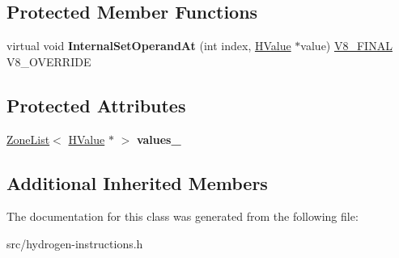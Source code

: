 \subsection*{Protected Member Functions}
\begin{DoxyCompactItemize}
\item 
\hypertarget{classv8_1_1internal_1_1_h_dematerialized_object_ace56861e04f0b484819e7523559d3c84}{}virtual void {\bfseries Internal\+Set\+Operand\+At} (int index, \hyperlink{classv8_1_1internal_1_1_h_value}{H\+Value} $\ast$value) \hyperlink{classv8_1_1internal_1_1_v8___f_i_n_a_l}{V8\+\_\+\+F\+I\+N\+A\+L} V8\+\_\+\+O\+V\+E\+R\+R\+I\+D\+E\label{classv8_1_1internal_1_1_h_dematerialized_object_ace56861e04f0b484819e7523559d3c84}

\end{DoxyCompactItemize}
\subsection*{Protected Attributes}
\begin{DoxyCompactItemize}
\item 
\hypertarget{classv8_1_1internal_1_1_h_dematerialized_object_a9d4594d10a05051dac2f37690acac70c}{}\hyperlink{classv8_1_1internal_1_1_zone_list}{Zone\+List}$<$ \hyperlink{classv8_1_1internal_1_1_h_value}{H\+Value} $\ast$ $>$ {\bfseries values\+\_\+}\label{classv8_1_1internal_1_1_h_dematerialized_object_a9d4594d10a05051dac2f37690acac70c}

\end{DoxyCompactItemize}
\subsection*{Additional Inherited Members}


The documentation for this class was generated from the following file\+:\begin{DoxyCompactItemize}
\item 
src/hydrogen-\/instructions.\+h\end{DoxyCompactItemize}
